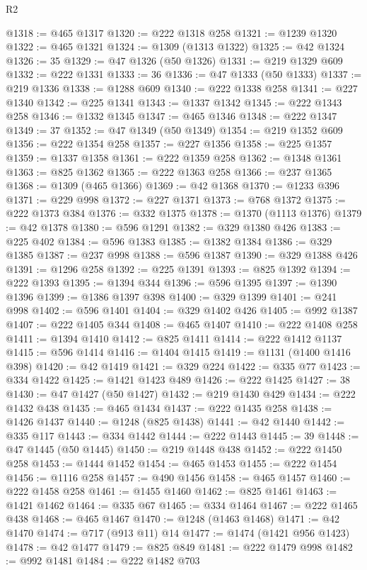 \begin{lexlean}{R2}
\begin{coremodule}
@1318 := @465 @1317
@1320 := @222 @1318 @258
@1321 := @1239 @1320
@1322 := @465 @1321
@1324 := @1309 (@1313 @1322)
@1325 := @42 @1324
@1326 := 35
@1329 := @47 @1326 (@50 @1326)
@1331 := @219 @1329 @609
@1332 := @222 @1331
@1333 := 36
@1336 := @47 @1333 (@50 @1333)
@1337 := @219 @1336
@1338 := @1288 @609
@1340 := @222 @1338 @258
@1341 := @227 @1340
@1342 := @225 @1341
@1343 := @1337 @1342
@1345 := @222 @1343 @258
@1346 := @1332 @1345
@1347 := @465 @1346
@1348 := @222 @1347
@1349 := 37
@1352 := @47 @1349 (@50 @1349)
@1354 := @219 @1352 @609
@1356 := @222 @1354 @258
@1357 := @227 @1356
@1358 := @225 @1357
@1359 := @1337 @1358
@1361 := @222 @1359 @258
@1362 := @1348 @1361
@1363 := @825 @1362
@1365 := @222 @1363 @258
@1366 := @237 @1365
@1368 := @1309 (@465 @1366)
@1369 := @42 @1368
@1370 := @1233 @396
@1371 := @229 @998
@1372 := @227 @1371
@1373 := @768 @1372
@1375 := @222 @1373 @384
@1376 := @332 @1375
@1378 := @1370 (@1113 @1376)
@1379 := @42 @1378
@1380 := @596 @1291
@1382 := @329 @1380 @426
@1383 := @225 @402
@1384 := @596 @1383
@1385 := @1382 @1384
@1386 := @329 @1385
@1387 := @237 @998
@1388 := @596 @1387
@1390 := @329 @1388 @426
@1391 := @1296 @258
@1392 := @225 @1391
@1393 := @825 @1392
@1394 := @222 @1393
@1395 := @1394 @344
@1396 := @596 @1395
@1397 := @1390 @1396
@1399 := @1386 @1397 @398
@1400 := @329 @1399
@1401 := @241 @998
@1402 := @596 @1401
@1404 := @329 @1402 @426
@1405 := @992 @1387
@1407 := @222 @1405 @344
@1408 := @465 @1407
@1410 := @222 @1408 @258
@1411 := @1394 @1410
@1412 := @825 @1411
@1414 := @222 @1412 @1137
@1415 := @596 @1414
@1416 := @1404 @1415
@1419 := @1131 (@1400 @1416 @398)
@1420 := @42 @1419
@1421 := @329 @224
@1422 := @335 @77
@1423 := @334 @1422
@1425 := @1421 @1423 @489
@1426 := @222 @1425
@1427 := 38
@1430 := @47 @1427 (@50 @1427)
@1432 := @219 @1430 @429
@1434 := @222 @1432 @438
@1435 := @465 @1434
@1437 := @222 @1435 @258
@1438 := @1426 @1437
@1440 := @1248 (@825 @1438)
@1441 := @42 @1440
@1442 := @335 @117
@1443 := @334 @1442
@1444 := @222 @1443
@1445 := 39
@1448 := @47 @1445 (@50 @1445)
@1450 := @219 @1448 @438
@1452 := @222 @1450 @258
@1453 := @1444 @1452
@1454 := @465 @1453
@1455 := @222 @1454
@1456 := @1116 @258
@1457 := @490 @1456
@1458 := @465 @1457
@1460 := @222 @1458 @258
@1461 := @1455 @1460
@1462 := @825 @1461
@1463 := @1421 @1462
@1464 := @335 @67
@1465 := @334 @1464
@1467 := @222 @1465 @438
@1468 := @465 @1467
@1470 := @1248 (@1463 @1468)
@1471 := @42 @1470
@1474 := @717 (@913 @11) @14
@1477 := @1474 (@1421 @956 @1423)
@1478 := @42 @1477
@1479 := @825 @849
@1481 := @222 @1479 @998
@1482 := @992 @1481
@1484 := @222 @1482 @703

\end{coremodule}
\end{lexlean}
